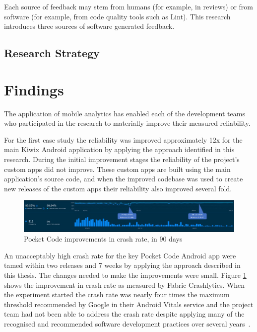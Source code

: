 Each source of feedback may stem from humans (for example, in reviews) or from software (for example, from code quality tools such as Lint). This research introduces three sources of software generated feedback.

\subsection{Research Strategy}


\section{Findings}\label{findings-section}
The application of mobile analytics has enabled each of the development teams who participated in the research to materially improve their measured reliability. 

For the first case study the reliability was improved approximately 12x for the main Kiwix Android application by applying the approach identified in this research. 
During the initial improvement stages the reliability of the project's custom apps did not improve. These custom apps are built using the main application's source code, and when the improved codebase was used to create new releases of the custom apps their reliability also improved several fold.

\begin{figure}[ht]
    \centering
    \includegraphics[width=\textwidth]{images/annotated_pocketcode_90_day_fabric_crashlytics_report.jpg}
    \caption{Pocket Code improvements in crash rate, in 90 days}
    \label{fig:pocketcode_improvements_in_crash_rate}
\end{figure}

An unacceptably high crash rate for the key Pocket Code Android app were tamed within two releases and 7 weeks by applying the approach described in this thesis. The changes needed to make the improvements were small. Figure \ref{fig:pocketcode_improvements_in_crash_rate} shows the improvement in crash rate as measured by Fabric Crashlytics. When the experiment started the crash rate was nearly four times the maximum threshold recommended by Google in their Android Vitals service and the project team had not been able to address the crash rate despite applying many of the recognised and recommended software development practices over several years~\cite{adamsen2015systematic_catrobat, luhana2018streamlining, ali2019behavior_catrobat, ali2019using_catrobat, hirsch2019approach_catrobat, schranz2019contributors_catrobat, slany2014tinkering}.

